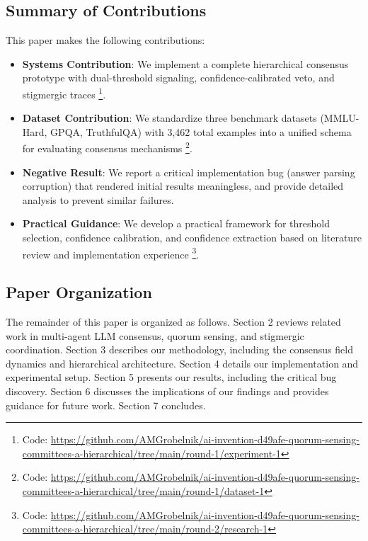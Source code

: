 \documentclass[11pt,letterpaper]{article}
\begin{document}
\subsection{Summary of Contributions}

This paper makes the following contributions:

\begin{itemize}
\item \textbf{Systems Contribution}: We implement a complete hierarchical consensus prototype with dual-threshold signaling, confidence-calibrated veto, and stigmergic traces \footnote{Code: \url{https://github.com/AMGrobelnik/ai-invention-d49afe-quorum-sensing-committees-a-hierarchical/tree/main/round-1/experiment-1}}.

\item \textbf{Dataset Contribution}: We standardize three benchmark datasets (MMLU-Hard, GPQA, TruthfulQA) with 3,462 total examples into a unified schema for evaluating consensus mechanisms \footnote{Code: \url{https://github.com/AMGrobelnik/ai-invention-d49afe-quorum-sensing-committees-a-hierarchical/tree/main/round-1/dataset-1}}.

\item \textbf{Negative Result}: We report a critical implementation bug (answer parsing corruption) that rendered initial results meaningless, and provide detailed analysis to prevent similar failures.

\item \textbf{Practical Guidance}: We develop a practical framework for threshold selection, confidence calibration, and confidence extraction based on literature review and implementation experience \footnote{Code: \url{https://github.com/AMGrobelnik/ai-invention-d49afe-quorum-sensing-committees-a-hierarchical/tree/main/round-2/research-1}}.
\end{itemize}

\subsection{Paper Organization}

The remainder of this paper is organized as follows. Section 2 reviews related work in multi-agent LLM consensus, quorum sensing, and stigmergic coordination. Section 3 describes our methodology, including the consensus field dynamics and hierarchical architecture. Section 4 details our implementation and experimental setup. Section 5 presents our results, including the critical bug discovery. Section 6 discusses the implications of our findings and provides guidance for future work. Section 7 concludes.
\end{document}
